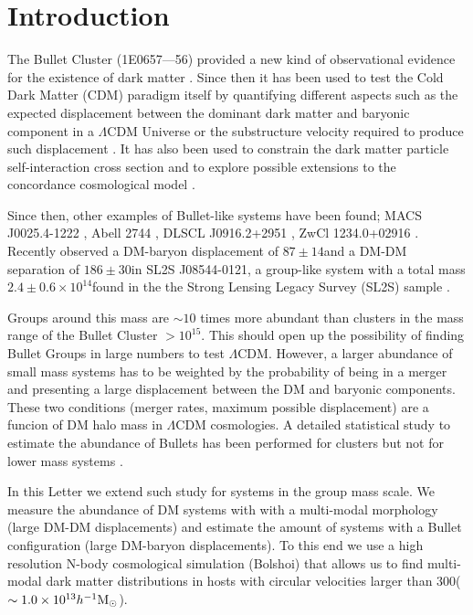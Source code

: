 \documentclass{emulateapj}
\newcommand{\hkpc}{{\ifmmode{h^{-1}{\rm kpc}}\else{$h^{-1}$kpc }\fi}}
\newcommand{\hMsun}{{\ifmmode{h^{-1}{\rm {M_{\odot}}}}\else{$h^{-1}{\rm{M_{\odot}}}$}\fi}}
\newcommand{\Msun}{{\ifmmode{{\rm {M_{\odot}}}}\else{${\rm{M_{\odot}}}$}\fi}}
\newcommand{\kms}{{\ifmmode{{\mathrm{\,km\ s}^{-1}}}\else{\,km~s$^{-1}$}\fi}}
\newcommand{\bulla}{1E0657---56}
\newcommand{\bullg}{SL2S J08544-0121}
\begin{document}


\section{Introduction}


The Bullet Cluster (\bulla) provided a new kind of observational
evidence for the existence of dark matter
\citep{Markevitch2004,Clowe2006}. Since then it has been used to test
the Cold Dark Matter (CDM) paradigm itself by quantifying different
aspects such as the expected displacement between the dominant dark
matter and baryonic component in a $\Lambda$CDM Universe
\citep{ForeroRomero2010} or the substructure velocity required to
produce such displacement \citep{Hayashi2006, Springel2007,
  Thompson2012}. It has also been used to constrain the dark matter
particle self-interaction cross section and to explore possible
extensions to the concordance cosmological model
\citep{Farrar2007,Lee2010,Lee2012}.      
 

Since then, other examples of Bullet-like systems have been found; 
MACS J0025.4-1222 \citep{Bradac2008}, Abell 2744 \citep{Merten2011},
DLSCL J0916.2+2951 \citep{Dawson2012}, ZwCl 1234.0+02916
\citep{Dahle2013}. Recently \citep{Gastaldello} observed a DM-baryon
displacement of $87\pm 14$\hkpc and a DM-DM separation of $186\pm
30$\hkpc in \bullg, a group-like system with a total
mass $2.4\pm 0.6 \times 10^{14}$\Msun found in the the Strong Lensing
Legacy Survey (SL2S) sample \citep{Cabanac2007,More2012}.


Groups around this mass are $\sim10$ times more abundant than clusters
in the mass range of the Bullet Cluster $>10^{15}$\hMsun. This 
should open up the possibility of finding Bullet Groups in large
numbers to test $\Lambda$CDM. However, a larger abundance of small
mass systems has to be weighted by the probability of being in a
merger and  presenting a large displacement between the DM and
baryonic components.  These two conditions (merger rates, maximum
possible displacement) are a funcion of DM halo mass in $\Lambda$CDM
cosmologies.  A detailed statistical study to estimate the abundance
of Bullets has been performed for clusters but not for lower mass
systems \citep{ForeroRomero2010}.  

In this Letter we extend such study for systems in the group mass
scale. We measure the abundance of DM systems with with a multi-modal
morphology (large DM-DM displacements) and estimate the amount of
systems with a Bullet configuration  (large DM-baryon
displacements). To this end we use a high resolution N-body
cosmological simulation (Bolshoi) that allows us to find  multi-modal
dark matter distributions in hosts with circular velocities larger
than $300$\kms ($\sim 1.0\times 10^{13}\hMsun$).
\end{document}
